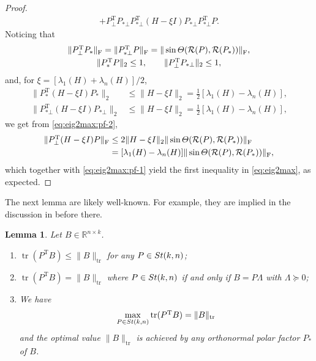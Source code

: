 \documentclass[11pt]{article}
\def\bbR{\mathbb{R}}
\def\cR{{\cal R}}
\newcommand\STM[2]{{\rm St}(#1,#2)}
\DeclareMathOperator{\tr}{tr}
\DeclareMathOperator{\F}{F}
\DeclareMathOperator{\T}{T}
\newtheorem{lemma}{Lemma}[section]
\theoremstyle{definition}
\numberwithin{equation}{section}
\begin{document}
\begin{proof}
\begin{align}
     +P_{\bot}^{\T}P_{*\bot}P_{*\bot}^{\T}(H-\xi I)P_{*\bot}P_{*\bot}^{\T}P.  \label{eq:eig2max:pf-2}
\end{align}
Noticing that
\begin{gather*}
\|P_{\bot}^{\T}P_*\|_{\F}=\|P_{*\bot}^{\T}P\|_{\F}=\|\sin\Theta(\cR(P),\cR(P_*))\|_{\F}, \\
\|P_*^{\T}P\|_2\le 1, \qquad\|P_{\bot}^{\T}P_{*\bot}\|_2\le 1,
\end{gather*}
and, for $\xi=[\lambda_1(H)+\lambda_n(H)]/2$,
\begin{align*}
\|P_*^{\T}(H-\xi I)P_*\|_2&\le\|H-\xi I\|_2=\frac 12 [\lambda_1(H)-\lambda_n(H)], \\
\|P_{*\bot}^{\T}(H-\xi I)P_{*\bot}\|_2&\le\|H-\xi I\|_2=\frac 12 [\lambda_1(H)-\lambda_n(H)],
\end{align*}
we get from \eqref{eq:eig2max:pf-2},
\begin{align*}
\|P_{\bot}^{\T}(H-\xi I)P\|_{\F}&\le 2\|H-\xi I\|_2\|\sin\Theta(\cR(P),\cR(P_*))\|_{\F} \\
    &=[\lambda_1(H)-\lambda_n(H)]\|\sin\Theta(\cR(P),\cR(P_*))\|_{\F},
\end{align*}
which together with \eqref{eq:eig2max:pf-1} yield the first inequality in \eqref{eq:eig2max}, as expected.
\end{proof}

%


The next lemma are likely well-known. For example, they are implied in the discussion in \cite{wazl:2022a} before
\cite[Lemma~ 3.2]{wazl:2022a} there.

\begin{lemma}\label{lm:polar2max}
Let $B\in\bbR^{n\times k}$.
\begin{enumerate}[{\rm (a)}]
  \item $\tr(P^{\T}B)\le\|B\|_{\tr}$ for any $P\in\STM{k}{n}$;
  \item $\tr(P^{\T}B)=\|B\|_{\tr}$ where $P\in\STM{k}{n}$ if and only if $B=P\Lambda$ with $\Lambda\succeq 0$;
  \item We have
        $$
        \max_{P\in\STM{k}{n}}\tr(P^{\T}B)=\|B\|_{\tr}
        $$
        and the optimal value $\|B\|_{\tr}$ is achieved by any orthonormal polar factor $P_*$ of $B$.
\end{enumerate}
\end{lemma}
\end{document}
